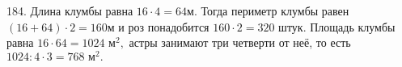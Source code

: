 184. Длина клумбы равна $16\cdot4=64$м. Тогда периметр клумбы равен $(16+64)\cdot2=160$м и роз понадобится $160\cdot2=320$ штук. Площадь клумбы равна $16\cdot64=1024\text{ м}^2,$ астры занимают три четверти от неё, то есть $1024:4\cdot3=768\text{ м}^2.$\\
